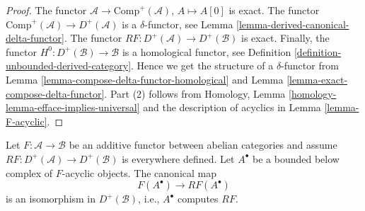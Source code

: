\begin{proof}
The functor $\mathcal{A} \to \text{Comp}^{+}(\mathcal{A})$,
$A \mapsto A[0]$ is exact. The functor
$\text{Comp}^{+}(\mathcal{A}) \to D^{+}(\mathcal{A})$
is a $\delta$-functor, see
Lemma \ref{lemma-derived-canonical-delta-functor}.
The functor $RF : D^{+}(\mathcal{A}) \to D^{+}(\mathcal{B})$ is exact.
Finally, the functor $H^0 : D^{+}(\mathcal{B}) \to \mathcal{B}$
is a homological functor, see
Definition \ref{definition-unbounded-derived-category}.
Hence we get the structure of a $\delta$-functor from
Lemma \ref{lemma-compose-delta-functor-homological}
and
Lemma \ref{lemma-exact-compose-delta-functor}.
Part (2) follows from
Homology, Lemma \ref{homology-lemma-efface-implies-universal}
and the description of acyclics in
Lemma \ref{lemma-F-acyclic}.
\end{proof}

\begin{lemma}
\label{lemma-leray-acyclicity}
Let $F : \mathcal{A} \to \mathcal{B}$ be an additive functor
between abelian categories and assume
$RF : D^{+}(\mathcal{A}) \to D^{+}(\mathcal{B})$ is everywhere defined.
Let $A^\bullet$ be a bounded below complex of $F$-acyclic objects.
The canonical map
$$
F(A^\bullet) \longrightarrow RF(A^\bullet)
$$
is an isomorphism in $D^{+}(\mathcal{B})$, i.e., $A^\bullet$ computes
$RF$.
\end{lemma}

